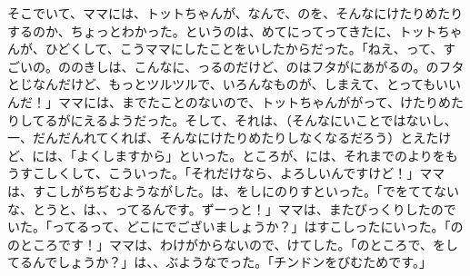 そこでいて、ママには、トットちゃんが、なんで、のを、そんなにけたりめたりするのか、ちょっとわかった。というのは、めてにってってきたに、トットちゃんが、ひどくして、こうママにしたことをいしたからだった。「ねえ、って、すごいの。ののきしは、こんなに、っるのだけど、のはフタがにあがるの。のフタとじなんだけど、もっとツルツルで、いろんなものが、しまえて、とってもいいんだ！」ママには、までたことのないので、トットちゃんががって、けたりめたりしてるがにえるようだった。そして、それは、（そんなにいことではないし、一、だんだんれてくれば、そんなにけたりめたりしなくなるだろう）とえたけど、には、「よくしますから」といった。ところが、には、それまでのよりをもうすこしくして、こういった。「それだけなら、よろしいんですけど！」ママは、すこしがちぢむようながした。は、をしにのりすといった。「でをててないな、とうと、は、、ってるんです。ずーっと！」ママは、またびっくりしたのでいた。「ってるって、どこにでございましょうか？」はすこしったにいった。「ののところです！」ママは、わけがからないので、けてした。「のところで、をしてるんでしょうか？」は、、ぶようなでった。「チンドンをびむためです。」

